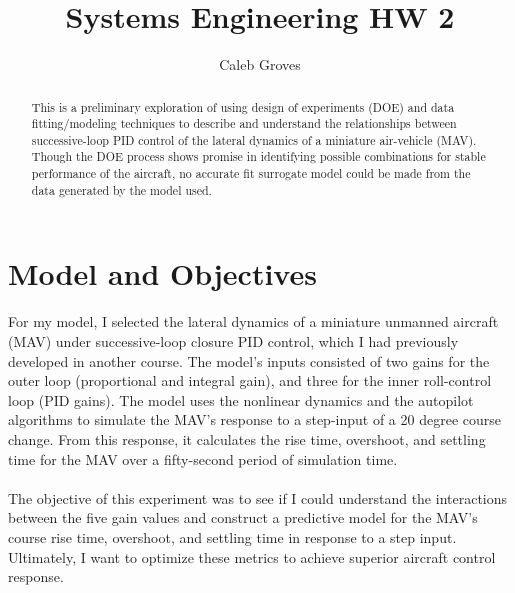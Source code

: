 \documentclass{article}
\title{Systems Engineering HW 2}
\author{Caleb Groves}
\begin{document}
\maketitle

\begin{abstract}
	This is a preliminary exploration of using design of experiments (DOE) and data fitting/modeling techniques to describe and understand the relationships between successive-loop PID control of the lateral dynamics of a miniature air-vehicle (MAV). Though the DOE process shows promise in identifying possible combinations for stable performance of the aircraft, no accurate fit surrogate model could be made from the data generated by the model used.
\end{abstract}

\section{Model and Objectives}
For my model, I selected the lateral dynamics of a miniature unmanned aircraft (MAV) under successive-loop closure PID control, which I had previously developed in another course. The model’s inputs consisted of two gains for the outer loop (proportional and integral gain), and three for the inner roll-control loop (PID gains). The model uses the nonlinear dynamics and the autopilot algorithms to simulate the MAV’s response to a step-input of a 20 degree course change. From this response, it calculates the rise time, overshoot, and settling time for the MAV over a fifty-second period of simulation time.
\\\\The objective of this experiment was to see if I could understand the interactions between the five gain values and construct a predictive model for the MAV’s course rise time, overshoot, and settling time in response to a step input. Ultimately, I want to optimize these metrics to achieve superior aircraft control response.
\end{document}
